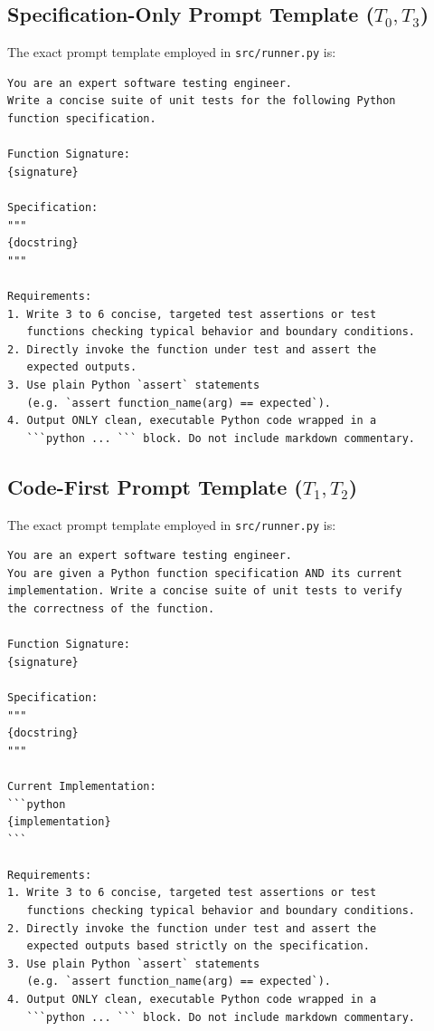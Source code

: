 \documentclass[11pt,a4paper]{article}
\begin{document}
\subsection{\texorpdfstring{Specification-Only Prompt Template ($T_0, T_3$)}{Specification-Only Prompt Template (T0, T3)}}
The exact prompt template employed in \texttt{src/runner.py} is:
{\small
\begin{verbatim}
You are an expert software testing engineer.
Write a concise suite of unit tests for the following Python
function specification.

Function Signature:
{signature}

Specification:
"""
{docstring}
"""

Requirements:
1. Write 3 to 6 concise, targeted test assertions or test
   functions checking typical behavior and boundary conditions.
2. Directly invoke the function under test and assert the
   expected outputs.
3. Use plain Python `assert` statements
   (e.g. `assert function_name(arg) == expected`).
4. Output ONLY clean, executable Python code wrapped in a
   ```python ... ``` block. Do not include markdown commentary.
\end{verbatim}
}

\subsection{\texorpdfstring{Code-First Prompt Template ($T_1, T_2$)}{Code-First Prompt Template (T1, T2)}}
The exact prompt template employed in \texttt{src/runner.py} is:
{\small
\begin{verbatim}
You are an expert software testing engineer.
You are given a Python function specification AND its current
implementation. Write a concise suite of unit tests to verify
the correctness of the function.

Function Signature:
{signature}

Specification:
"""
{docstring}
"""

Current Implementation:
```python
{implementation}
```

Requirements:
1. Write 3 to 6 concise, targeted test assertions or test
   functions checking typical behavior and boundary conditions.
2. Directly invoke the function under test and assert the
   expected outputs based strictly on the specification.
3. Use plain Python `assert` statements
   (e.g. `assert function_name(arg) == expected`).
4. Output ONLY clean, executable Python code wrapped in a
   ```python ... ``` block. Do not include markdown commentary.
\end{verbatim}
}
\end{document}
